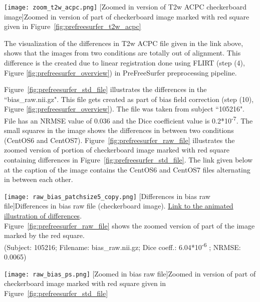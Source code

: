\begin{center}
\texttt{[image: zoom\_t2w\_acpc.png]}
[Zoomed in version of T2w ACPC checkerboard image]{Zoomed in version of part of checkerboard image marked with red square given in Figure~\ref{fig:prefreesurfer_t2w_acpc}}
\label{fig:prefreesurfer_zoom_t2w}
\end{center}

The visualization of the differences in T2w ACPC file given in the link above, shows that the images from two conditions are totally out of alignment. This difference is the created due to linear registration done using FLIRT (step (4), Figure \ref{fig:prefreesurfer_overview}) in PreFreeSurfer preprocessing pipeline.

Figure~\ref{fig:prefreesurfer_std_file} illustrates the differences in the ``bias\_raw.nii.gz".
This file gets created as part of bias field correction (step (10), Figure \ref{fig:prefreesurfer_overview}). The file was taken from subject ``105216". File has an NRMSE value of 0.036 and the Dice coefficient value is 0.2*10\textsuperscript{-7}. The small squares in the image shows the differences in between two conditions (CentOS6 and CentOS7).
Figure~\ref{fig:prefreesurfer_raw_file} illustrates the zoomed version of portion of checkerboard image marked with red square containing differences in Figure~\ref{fig:prefreesurfer_std_file}.
The link given below at the caption of the image contains the CentOS6 and CentOS7 files alternating in between each other.

\begin{center}
\texttt{[image: raw\_bias\_patchsize5\_copy.png]}
[Differences in bias raw file]{Differences in bias raw file (checkerboard image). \href{https://drive.google.com/file/d/1rbGR0zGPQsOPzEVkiR6NynudbfjDFLvn/view?usp=sharing}{Link to the animated illustration of differences}.\\Figure~\ref{fig:prefreesurfer_raw_file} shows the zoomed version of part of the image marked by the red square.\\(Subject: 105216; Filename: bias\_raw.nii.gz; Dice coeff.: 6.04*10\textsuperscript{-6} ; NRMSE: 0.0065)}
\label{fig:prefreesurfer_std_file}
\end{center}

\begin{center}
\texttt{[image: raw\_bias\_ps.png]}
[Zoomed in bias raw file]{Zoomed in version of part of checkerboard image marked with red square given in Figure~\ref{fig:prefreesurfer_std_file}}
\label{fig:prefreesurfer_raw_file}
\end{center}


